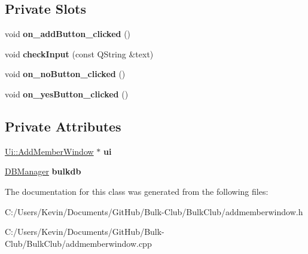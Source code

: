 \subsection*{Private Slots}
\begin{DoxyCompactItemize}
\item 
\mbox{\label{class_add_member_window_ab76bc07bd777526200167969e22b1c73}} 
void {\bfseries on\+\_\+add\+Button\+\_\+clicked} ()
\item 
\mbox{\label{class_add_member_window_a709d7c0307a261c135847160cfb98a69}} 
void {\bfseries check\+Input} (const Q\+String \&text)
\item 
\mbox{\label{class_add_member_window_a03f711e25306cde908775af426722d89}} 
void {\bfseries on\+\_\+no\+Button\+\_\+clicked} ()
\item 
\mbox{\label{class_add_member_window_ac0c0206c606db5f70d610d3d5c8239a3}} 
void {\bfseries on\+\_\+yes\+Button\+\_\+clicked} ()
\end{DoxyCompactItemize}
\subsection*{Private Attributes}
\begin{DoxyCompactItemize}
\item 
\mbox{\label{class_add_member_window_a247bde6200fc6b2b7a086d14946201f9}} 
\mbox{\hyperlink{class_ui_1_1_add_member_window}{Ui\+::\+Add\+Member\+Window}} $\ast$ {\bfseries ui}
\item 
\mbox{\label{class_add_member_window_aad52757dee158cdc1f2c7d28a140d7bf}} 
\mbox{\hyperlink{class_d_b_manager}{D\+B\+Manager}} {\bfseries bulkdb}
\end{DoxyCompactItemize}


The documentation for this class was generated from the following files\+:\begin{DoxyCompactItemize}
\item 
C\+:/\+Users/\+Kevin/\+Documents/\+Git\+Hub/\+Bulk-\/\+Club/\+Bulk\+Club/addmemberwindow.\+h\item 
C\+:/\+Users/\+Kevin/\+Documents/\+Git\+Hub/\+Bulk-\/\+Club/\+Bulk\+Club/addmemberwindow.\+cpp\end{DoxyCompactItemize}
